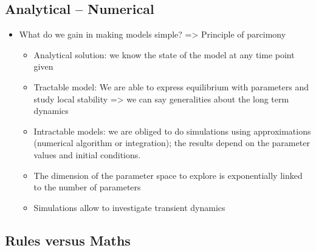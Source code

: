 \documentclass[
]{book}
\providecommand{\tightlist}{%
  \setlength{\itemsep}{0pt}\setlength{\parskip}{0pt}}
\theoremstyle{definition}
\theoremstyle{definition}
\theoremstyle{definition}
\theoremstyle{definition}
\theoremstyle{remark}
\begin{document}
\subsection{Analytical -- Numerical}\label{analytical-numerical}

\begin{itemize}
\tightlist
\item
  What do we gain in making models simple? =\textgreater{} Principle of parcimony

  \begin{itemize}
  \tightlist
  \item
    Analytical solution: we know the state of the model at any time point given
  \item
    Tractable model: We are able to express equilibrium with parameters and study local stability =\textgreater{} we can say generalities about the long term dynamics
  \item
    Intractable models: we are obliged to do simulations using approximations (numerical algorithm or integration); the results depend on the parameter values and initial conditions.
  \item
    The dimension of the parameter space to explore is exponentially linked to the number of parameters
  \item
    Simulations allow to investigate transient dynamics
  \end{itemize}
\end{itemize}

\subsection{Rules versus Maths}\label{rules-versus-maths}
\end{document}
